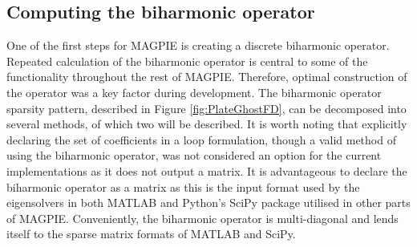 \subsection{Computing the biharmonic operator}

One of the first steps for MAGPIE is creating a discrete biharmonic operator. Repeated calculation of the biharmonic operator is central to some of the functionality throughout the rest of MAGPIE. Therefore, optimal construction of the operator was a key factor during development. The biharmonic operator sparsity pattern, described in Figure \ref{fig:PlateGhostFD},  can be decomposed into several methods, of which two will be described. It is worth noting that explicitly declaring the set of coefficients in a loop formulation, though a valid method of using the biharmonic operator, was not considered an option for the current implementations as it does not output a matrix. It is advantageous to declare the biharmonic operator as a matrix as this is the input format used by the eigensolvers in both MATLAB and Python's SciPy package utilised in other parts of MAGPIE. Conveniently, the biharmonic operator is multi-diagonal and lends itself to the sparse matrix formats of MATLAB and SciPy.\\
 
